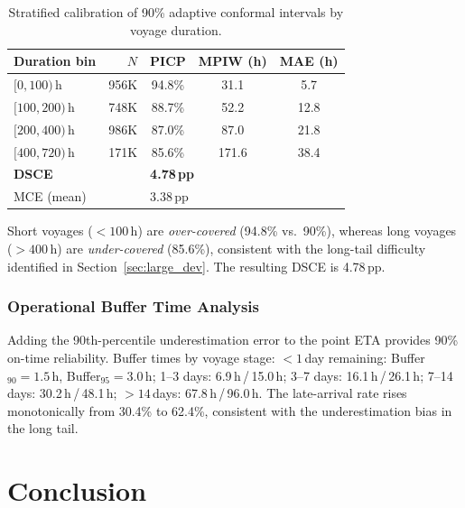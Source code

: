 \documentclass[sigconf,anonymous]{acmart}%
\begin{document}
\begin{table}[t]
    \centering
    \caption{Stratified calibration of 90\% adaptive conformal intervals by voyage duration.}
    \label{tab:stratified_calib}
    \footnotesize
    \begin{tabular}{lrccc}
        \toprule
        \textbf{Duration bin} & \textbf{$N$} & \textbf{PICP} & \textbf{MPIW (h)} & \textbf{MAE (h)} \\
        \midrule
        $[0, 100)$\,h   & 956K  & 94.8\% & 31.1  & 5.7  \\
        $[100, 200)$\,h  & 748K  & 88.7\% & 52.2  & 12.8 \\
        $[200, 400)$\,h  & 986K  & 87.0\% & 87.0  & 21.8 \\
        $[400, 720)$\,h  & 171K  & 85.6\% & 171.6 & 38.4 \\
        \midrule
        \multicolumn{2}{l}{\textbf{DSCE}} & \multicolumn{3}{l}{\textbf{4.78\,pp}} \\
        \multicolumn{2}{l}{MCE (mean)} & \multicolumn{3}{l}{3.38\,pp} \\
        \bottomrule
    \end{tabular}
\end{table}

\noindent Short voyages ($< 100$\,h) are \textit{over-covered} (94.8\% vs.\ 90\%), whereas long voyages ($> 400$\,h) are \textit{under-covered} (85.6\%), consistent with the long-tail difficulty identified in Section~\ref{sec:large_dev}. The resulting DSCE is 4.78\,pp.

\subsubsection{Operational Buffer Time Analysis}

Adding the 90th-percentile underestimation error to the point ETA provides 90\% on-time reliability. Buffer times by voyage stage: $<1$\,day remaining: Buffer$_{90}{=}1.5$\,h, Buffer$_{95}{=}3.0$\,h; 1--3 days: 6.9\,h\,/\,15.0\,h; 3--7 days: 16.1\,h\,/\,26.1\,h; 7--14 days: 30.2\,h\,/\,48.1\,h; $>14$\,days: 67.8\,h\,/\,96.0\,h. The late-arrival rate rises monotonically from 30.4\% to 62.4\%, consistent with the underestimation bias in the long tail.


\section{Conclusion}
\end{document}
